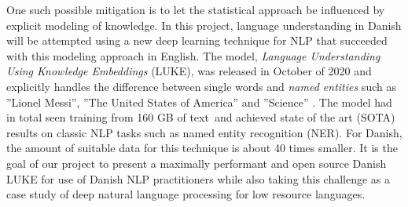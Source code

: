 \documentclass[main.tex]{subfiles}
\begin{document}
One such possible mitigation is to let the statistical approach be influenced by explicit modeling of knowledge.
In this project, language understanding in Danish will be attempted using a new deep learning technique for NLP that succeeded with this modeling approach in English.
The model, \emph{Language Understanding Using Knowledge Embeddings} (LUKE), was released in October of 2020 and explicitly handles the difference between single words and \emph{named entities} such as ''Lionel Messi'', ''The United States of America'' and ''Science'' \cite{yamada2020luke}.
The model had in total seen training from 160 GB of text\footnotemark~and achieved state of the art (SOTA) results on classic NLP tasks such as named entity recognition (NER).
For Danish, the amount of suitable data for this technique is about 40 times smaller\footnotemark.
It is the goal of our project to present a maximally performant and open source Danish LUKE for use of Danish NLP practitioners while also taking this challenge as a case study of deep natural language processing for low resource languages.
\end{document}
